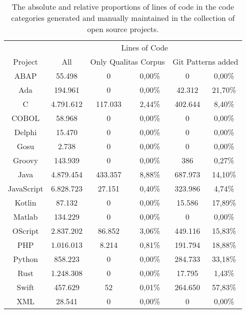 \setlength{\extrarowheight}{-.0em}
\begin{table}
		\caption[Lines of code distributions in the collection of open source projects.]{The absolute and relative proportions of lines of code in the code categories generated and manually maintained in the collection of open source projects.}
	\label{table:locGit}
	\begin{tabularx}{\textwidth}{c|c|c|c|c|c}
		& \multicolumn{5}{c}{Lines of Code}  \\
		Project & All & \multicolumn{2}{c|}{Only Qualitas Corpus} & \multicolumn{2}{c}{Git Patterns added}  \\
		\hline
		ABAP & 55.498 & 0 & 0,00\% & 0 & 0,00\% \\
		Ada & 194.961 & 0 & 0,00\% & 42.312 & 21,70\% \\
		C & 4.791.612 & 117.033 & 2,44\% & 402.644 & 8,40\% \\
		COBOL & 58.968 & 0 & 0,00\% & 0 & 0,00\% \\
		Delphi & 15.470 & 0 & 0,00\% & 0 & 0,00\% \\
		Gosu & 2.738 & 0 & 0,00\% & 0 & 0,00\% \\
		Groovy & 143.939 & 0 & 0,00\% & 386 & 0,27\% \\
		Java & 4.879.454 & 433.357 & 8,88\% & 687.973 & 14,10\% \\
		JavaScript & 6.828.723 & 27.151 & 0,40\% & 323.986 & 4,74\% \\
		Kotlin & 87.132 & 0 & 0,00\% & 15.586 & 17,89\% \\
		Matlab & 134.229 & 0 & 0,00\% & 0 & 0,00\% \\
		OScript & 2.837.202 & 86.852 & 3,06\% & 449.116 & 15,83\% \\
		PHP & 1.016.013 & 8.214 & 0,81\% & 191.794 & 18,88\% \\
		Python & 858.223 & 0 & 0,00\% & 284.733 & 33,18\% \\
		Rust & 1.248.308 & 0 & 0,00\% & 17.795 & 1,43\% \\
		Swift & 457.629 & 52 & 0,01\% & 264.650 & 57,83\% \\
		XML & 28.541 & 0 & 0,00\% & 0 & 0,00\% \\		
	\end{tabularx}
\end{table}
\setlength{\extrarowheight}{0em}